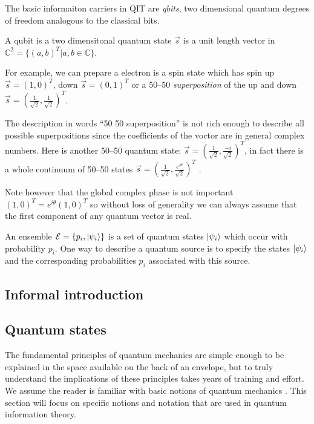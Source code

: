 \documentclass[aps,11pt,twoside,letterpaper]{article}
\def\c{\mathbb{C}}
\def\E{\mathcal{E}}
\begin{document}
        The basic informaiton carriers in QIT are \emph{qbits}, two dimensional quantum degrees
        of freedom analogous to the classical bits. 

        \begin{definition}[qubit]
            A qubit is a two dimensitonal quantum state $\vec{s}$ is a 
            unit length vector in $\c^2 = \{(a,b)^T| a,b \in \c\}$.
        \end{definition}

        For example, we can prepare a electron is a spin state which has spin up $\vec{s}=(1,0)^T$,
        down $\vec{s}=(0,1)^T$ or a 50--50 \emph{superposition} of the up and down $\vec{s} = (\frac{1}{\sqrt{2}}, \frac{1}{\sqrt{2}})^T$.

        The description in words ``50 50 superposition'' is not rich enough to describe all possible superpositions since
        the coefficients of the voctor are in general complex numbers. 
        Here is another 50--50 quantum state: $\vec{s} = (\frac{1}{\sqrt{2}}, \frac{-i}{\sqrt{2}})^T$, in fact there is a
        whole continuum of 50--50  states $\vec{s} = (\frac{1}{\sqrt{2}}, \frac{e^{i\theta}}{\sqrt{2}})^T$ .

        Note however that the global complex phase is not important $(1,0)^T= e^{i\theta}(1,0)^T$ so without loss
        of generality we can always assume that the first component of any quantum vector is real.


        An ensemble $\E=\{p_i, \ket{\psi_i} \}$ is a set of quantum states $| \psi_i \rangle$ which occur with 
        probability $p_i$. 
        One way to describe a quantum source is to specify the states $| \psi_i \rangle$ and the
        corresponding probabilities $p_i$ associated with this source. 


    \subsection{Informal introduction}

		

		\bigskip
		\subsection{Quantum states}
			
			The fundamental principles of quantum mechanics are simple enough to be explained in the space
			available on the back of an envelope, but to truly understand the implications of these
			principles takes years of training and effort.
			We assume the reader is familiar with basic notions of quantum mechanics \cite{sakurai,NC04}. 
			This section will focus on specific notions and notation that are used in quantum information theory.
			
\end{document}
